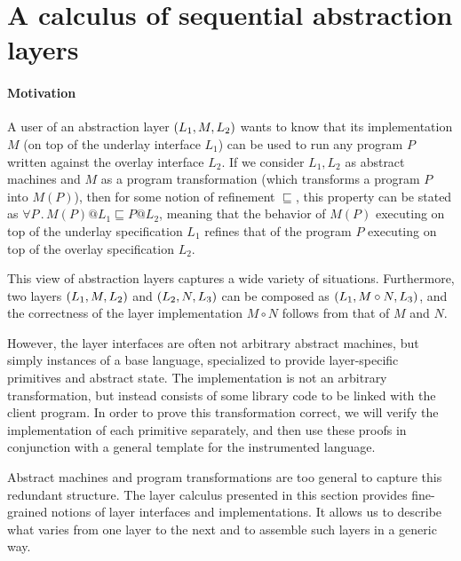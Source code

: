 \section{A calculus of sequential abstraction layers}
\label{sec:layer}

\paragraph{Motivation}

A user of an abstraction layer $(L_1,M,L_2)$ wants to know
that its implementation $M$ (on top of the underlay interface $L_1$)
can be used to run any program $P$ written against the overlay
interface $L_2$.
If we consider $L_1, L_2$ as abstract machines
and $M$ as a program transformation (which transforms
a program $P$ into $M(P)$), 
then for some notion of refinement $\sqsubseteq$,
this property can be stated as
$\forall P \,.\, M(P) @ L_1 \sqsubseteq P @ L_2$,
meaning that the behavior of $M(P)$ executing
on top of the underlay specification $L_1$
refines that of the program $P$
executing on top of the overlay specification $L_2$.

This view of abstraction layers captures a wide variety of situations.
Furthermore, two layers $(L_1,M,L_2)$ and
$(L_2,N,L_3)$ can be composed as $(L_1,M \circ
  N,L_3)$, and the correctness of the layer implementation $M \circ
N$ follows from that of $M$ and $N$.  

However, 
the layer interfaces
are often not arbitrary abstract machines, but simply instances of a base
language, specialized to provide layer-specific primitives and
abstract state.  The implementation is not an arbitrary
transformation, but instead consists of some library code to be linked
with the client program.  In order to prove this transformation correct,
we will verify the implementation of each primitive
separately, and then use these proofs in conjunction with a
general template for the instrumented language.

Abstract machines and program transformations are too general to
capture this redundant structure.  The layer calculus
presented in this section provides fine-grained notions of layer
interfaces and implementations.  It allows us to describe what varies
from one layer to the next and to assemble such layers 
in a generic way.

